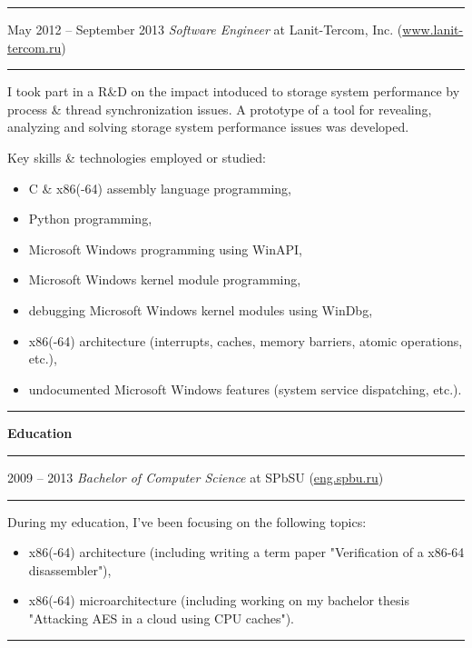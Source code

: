 \documentclass[11pt]{article}
\newcommand\CvSmallSkipLength{0.5em}
\newcommand\CvBigSkipLength{1em}
\newcommand\CvSkip[1]{\vspace{#1}}
\newcommand\CvSmallSkip{\CvSkip{\CvSmallSkipLength}}
\newcommand\CvBigSkip{\CvSkip{\CvBigSkipLength}}
\newcommand\CvSectionHeader[1]{\CvBigSkip\textbf{#1}\CvBigSkip}
\newcommand\CvRule{\begingroup\color{CvRuleColor}\hrule\endgroup}
\newcommand\CvWorkplaceHeader[5]{\begingroup%
  \CvRule
  \fboxsep0pt%
  \colorbox{CvWorkplaceHeaderColor}{%
    \begin{minipage}{\linewidth-2\fboxsep}%
\CvSmallSkip
#1 -- #2 \hfill \textit{#3} at #4 (\href{http://#5/}{#5})
\CvSmallSkip
    \end{minipage}%
  }%
  \CvRule
\endgroup}
\newenvironment{CvWorkplaceDescription}{%
    \begingroup\setlength\parskip{\CvSmallSkipLength}%
  }{%
    \CvSmallSkip\endgroup%
  }
\begin{document}
\CvWorkplaceHeader{May 2012}{September 2013}{Software Engineer}{Lanit-Tercom, Inc.}{www.lanit-tercom.ru}

\begin{CvWorkplaceDescription}
I took part in a R\&D on the impact intoduced to storage system performance by process \& thread synchronization issues.
A prototype of a tool for revealing, analyzing and solving storage system performance issues was developed.

Key skills \& technologies employed or studied:
\begin{itemize}[noitemsep]
\item C \& x86(-64) assembly language programming,
\item Python programming,
\item Microsoft Windows programming using WinAPI,
\item Microsoft Windows kernel module programming,
\item debugging Microsoft Windows kernel modules using WinDbg,
\item x86(-64) architecture (interrupts, caches, memory barriers, atomic operations, etc.),
\item undocumented Microsoft Windows features (system service dispatching, etc.).
\end{itemize}
\end{CvWorkplaceDescription}
\CvRule

\CvSectionHeader{Education}

\CvWorkplaceHeader{2009}{2013}{Bachelor of Computer Science}{SPbSU}{eng.spbu.ru}

\begin{CvWorkplaceDescription}
During my education, I've been focusing on the following topics:
\begin{itemize}[noitemsep]
\item x86(-64) architecture (including writing a term paper "Verification of a x86-64 disassembler"),
\item x86(-64) microarchitecture (including working on my bachelor thesis "Attacking AES in a cloud using CPU caches").
\end{itemize}
\end{CvWorkplaceDescription}
\CvRule
\end{document}
